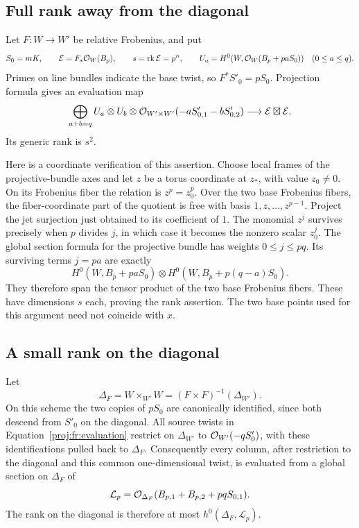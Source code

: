 \subsection{Full rank away from the diagonal}

Let \(F:W\to W'\) be relative Frobenius, and put
\[
 S_0=mK,\qquad
 \mathcal E=F_*\mathcal{O}_W(B_p),\qquad
 s=\operatorname{rk}\mathcal E=p^n,\qquad
 U_a=H^0(W,\mathcal{O}_W(B_p+paS_0))
 \quad(0\leq a\leq q).
\]
Primes on line bundles indicate the base twist, so
\(F^*S'_0=pS_0\). Projection formula gives an evaluation map
\begin{equation}
\label{proj:fr:evaluation}
 \bigoplus_{a+b=q}
 U_a\otimes U_b\otimes
 \mathcal{O}_{W'\times W'}(-aS'_{0,1}-bS'_{0,2})
 \longrightarrow\mathcal E\boxtimes\mathcal E.
\end{equation}
Its generic rank is \(s^2\).

Here is a coordinate verification of this assertion. Choose local
frames of the projective-bundle axes and let \(z\) be a torus coordinate
at \(z_*\), with value \(z_0\ne0\). On its Frobenius fiber the relation
is \(z^p=z_0^p\). Over the two base Frobenius fibers, the fiber-coordinate
part of the quotient is free with basis \(1,z,\ldots,z^{p-1}\).
Project the jet surjection just obtained to its coefficient of \(1\).
The monomial \(z^j\) survives precisely when \(p\) divides \(j\), in
which case it becomes the nonzero scalar \(z_0^j\).
The global section formula for the projective bundle has weights
\(0\leq j\leq pq\). Its surviving terms \(j=pa\) are exactly
\[
 H^0(W,B_p+paS_0)\otimes
 H^0(W,B_p+p(q-a)S_0).
\]
They therefore span the tensor product of the two base Frobenius
fibers. These have dimensions \(s\) each, proving the rank assertion.
The two base points used for this argument need not coincide with \(x\).

\subsection{A small rank on the diagonal}

Let
\[
 \Delta_F=W\times_{W'}W=(F\times F)^{-1}(\Delta_{W'}).
\]
On this scheme the two copies of \(pS_0\) are canonically identified,
since both descend from \(S'_0\) on the diagonal. All source twists
in Equation~\eqref{proj:fr:evaluation} restrict on \(\Delta_{W'}\) to
\(\mathcal{O}_{W'}(-qS'_0)\), with these identifications pulled back to
\(\Delta_F\). Consequently every column, after restriction to
the diagonal and this common one-dimensional twist, is evaluated from a
global section on \(\Delta_F\) of
\[
 \mathcal L_p=
 \mathcal{O}_{\Delta_F}(B_{p,1}+B_{p,2}+pqS_{0,1}).
\]
The rank on the diagonal is therefore at most
\(h^0(\Delta_F,\mathcal L_p)\).


